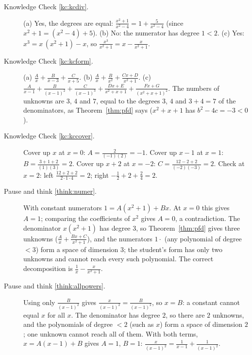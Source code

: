 \documentclass[11pt]{article}
\begin{document}
\begin{description}
  \item[Knowledge Check \ref{kc:kcdiv}.] (a) Yes, the degrees are equal: $\frac{x^2+1}{x^2-4}=1+\frac5{x^2-4}$ (since $x^2+1=(x^2-4)+5$). (b) No: the numerator has degree $1<2$. (c) Yes: $x^3=x\,(x^2+1)-x$, so $\frac{x^3}{x^2+1}=x-\frac x{x^2+1}$.

  \item[Knowledge Check \ref{kc:kcform}.] (a) $\frac Ax+\frac B{x-3}+\frac C{x+5}$. (b) $\frac Ax+\frac B{x^2}+\frac{Cx+D}{x^2+1}$. (c) $\frac A{x-1}+\frac B{(x-1)^2}+\frac C{(x-1)^3}+\frac{Dx+E}{x^2+x+1}+\frac{Fx+G}{(x^2+x+1)^2}$. The numbers of unknowns are $3$, $4$ and $7$, equal to the degrees $3$, $4$ and $3+4=7$ of the denominators, as Theorem~\ref{thm:pfd} says ($x^2+x+1$ has $b^2-4c=-3<0$).

  \item[Knowledge Check \ref{kc:kccover}.] Cover up $x$ at $x=0$: $A=\frac{2}{(-1)(2)}=-1$. Cover up $x-1$ at $x=1$: $B=\frac{3+1+2}{(1)(3)}=2$. Cover up $x+2$ at $x=-2$: $C=\frac{12-2+2}{(-2)(-3)}=2$. Check at $x=2$: left $\frac{12+2+2}{2\cdot1\cdot4}=2$; right $-\frac12+2+\frac24=2$.

  \item[Pause and think \ref{think:numer}.] With constant numerators $1=A(x^2+1)+Bx$. At $x=0$ this gives $A=1$; comparing the coefficients of $x^2$ gives $A=0$, a contradiction. The denominator $x(x^2+1)$ has degree $3$, so Theorem~\ref{thm:pfd} gives three unknowns ($\frac Ax+\frac{Bx+C}{x^2+1}$), and the numerators $1\cdot$ (any polynomial of degree $<3$) form a space of dimension $3$; the student's form has only two unknowns and cannot reach every such polynomial. The correct decomposition is $\frac1x-\frac x{x^2+1}$.

  \item[Pause and think \ref{think:allpowers}.] Using only $\frac B{(x-1)^2}$ gives $\frac{x}{(x-1)^2}=\frac B{(x-1)^2}$, so $x=B$: a constant cannot equal $x$ for all $x$. The denominator has degree $2$, so there are $2$ unknowns, and the polynomials of degree $<2$ (such as $x$) form a space of dimension $2$; one unknown cannot reach all of them. With both terms, $x=A(x-1)+B$ gives $A=1$, $B=1$: $\frac x{(x-1)^2}=\frac1{x-1}+\frac1{(x-1)^2}$.


\end{description}
\end{document}
